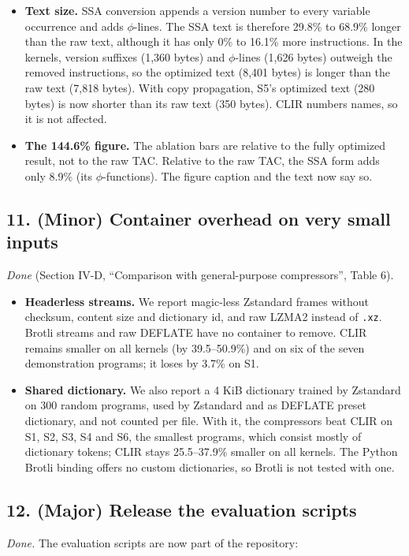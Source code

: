 \documentclass[11pt,a4paper]{article}
\begin{document}
\begin{itemize}
\item \textbf{Text size.} SSA conversion appends a version number to every variable occurrence and adds $\phi$-lines. The SSA text is therefore 29.8\% to 68.9\% longer than the raw text, although it has only 0\% to 16.1\% more instructions. In the kernels, version suffixes (1,360 bytes) and $\phi$-lines (1,626 bytes) outweigh the removed instructions, so the optimized text (8,401 bytes) is longer than the raw text (7,818 bytes). With copy propagation, S5's optimized text (280 bytes) is now shorter than its raw text (350 bytes). CLIR numbers names, so it is not affected.
\item \textbf{The 144.6\% figure.} The ablation bars are relative to the fully optimized result, not to the raw TAC. Relative to the raw TAC, the SSA form adds only 8.9\% (its $\phi$-functions). The figure caption and the text now say so.
\end{itemize}
\subsection*{11. (Minor) Container overhead on very small inputs}
\emph{Done} (Section IV-D, ``Comparison with general-purpose compressors'', Table 6).

\begin{itemize}
\item \textbf{Headerless streams.} We report magic-less Zstandard frames without checksum, content size and dictionary id, and raw LZMA2 instead of \texttt{.xz}. Brotli streams and raw DEFLATE have no container to remove. CLIR remains smaller on all kernels (by 39.5--50.9\%) and on six of the seven demonstration programs; it loses by 3.7\% on S1.
\item \textbf{Shared dictionary.} We also report a 4 KiB dictionary trained by Zstandard on 300 random programs, used by Zstandard and as DEFLATE preset dictionary, and not counted per file. With it, the compressors beat CLIR on S1, S2, S3, S4 and S6, the smallest programs, which consist mostly of dictionary tokens; CLIR stays 25.5--37.9\% smaller on all kernels. The Python Brotli binding offers no custom dictionaries, so Brotli is not tested with one.
\end{itemize}
\subsection*{12. (Major) Release the evaluation scripts}
\emph{Done.} The evaluation scripts are now part of the repository:
\end{document}
